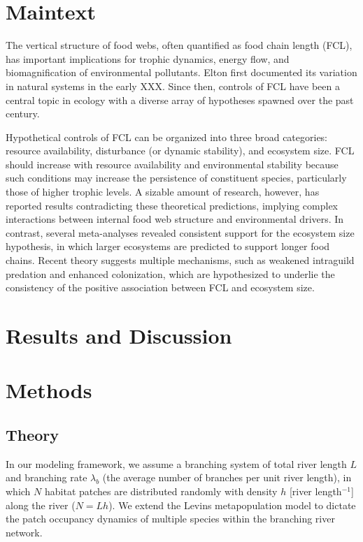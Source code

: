 \documentclass[11pt, class=article, crop=false]{standalone}
\begin{document}
\section{Maintext}

The vertical structure of food webs, often quantified as food chain length (FCL), has important implications for trophic dynamics, energy flow, and biomagnification of environmental pollutants.
Elton first documented its variation in natural systems in the early XXX.
Since then, controls of FCL have been a central topic in ecology with a diverse array of hypotheses spawned over the past century.

Hypothetical controls of FCL can be organized into three broad categories: resource availability, disturbance (or dynamic stability), and ecosystem size.
FCL should increase with resource availability and environmental stability because such conditions may increase the persistence of constituent species, particularly those of higher trophic levels.
A sizable amount of research, however, has reported results contradicting these theoretical predictions, implying complex interactions between internal food web structure and environmental drivers.
In contrast, several meta-analyses revealed consistent support for the ecosystem size hypothesis, in which larger ecosystems are predicted to support longer food chains.
Recent theory suggests multiple mechanisms, such as weakened intraguild predation and enhanced colonization, which are hypothesized to underlie the consistency of the positive association between FCL and ecosystem size.


\section{Results and Discussion}

\section{Methods}

\subsection{Theory}
In our modeling framework, we assume a branching system of total river length $L$ and branching rate $\lambda_b$ (the average number of branches per unit river length), in which $N$ habitat patches are distributed randomly with density $h$ [river length$^{-1}$] along the river ($N = Lh$).
We extend the Levins metapopulation model to dictate the patch occupancy dynamics of multiple species within the branching river network.
\end{document}
